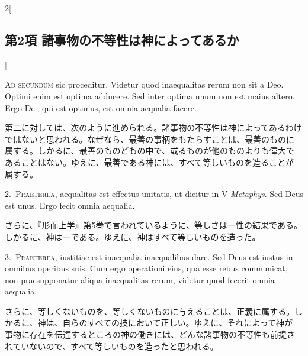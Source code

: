 \documentclass[paper=a4paper,fontsize=10pt,jafontsize=9pt,titlepage]{jlreq}
\begin{document}
\begin{paracol}{2}[\subsection{第2項 諸事物の不等性は神によってあるか}]

{\huge A}{\scshape d secundum} sic proceditur. Videtur quod inaequalitas
rerum non sit a Deo. Optimi enim est optima adducere. Sed inter optima
unum non est maius altero. Ergo Dei, qui est optimus, est omnia aequalia
facere.


\switchcolumn


第二に対しては、次のように進められる。諸事物の不等性は神によってあるわけ
 ではないと思われる。なぜなら、最善の事柄をもたらすことは、最善のものに
 属する。しかるに、最善のものどもの中で、或るものが他のものよりも偉大で
 あることはない。ゆえに、最善である神には、すべて等しいものを造ることが
 属する。




2.~{\scshape Praeterea}, aequalitas est effectus unitatis, ut dicitur in
V {\itshape Metaphys}. Sed Deus est unus. Ergo fecit omnia aequalia.


\switchcolumn


さらに、『形而上学』第5巻で言われているように、等しさは一性の結果である。
しかるに、神は一である。ゆえに、神はすべて等しいものを造った。




3.~{\scshape Praeterea}, iustitiae est inaequalia
inaequalibus dare. Sed Deus est iustus in omnibus operibus suis. Cum
ergo operationi eius, qua esse rebus communicat, non praesupponatur
aliqua inaequalitas rerum, videtur quod fecerit omnia aequalia.


\switchcolumn


さらに、等しくないものを、等しくないものに与えることは、正義に属する。し
 かるに、神は、自らのすべての技において正しい。ゆえに、それによって神が
 事物に存在を伝達するところの神の働きには、どんな諸事物の不等性も前提さ
 れていないので、すべて等しいものを造ったと思われる。


\switchcolumn*[\subsection{s.c.}]



\end{paracol}
\end{document}
